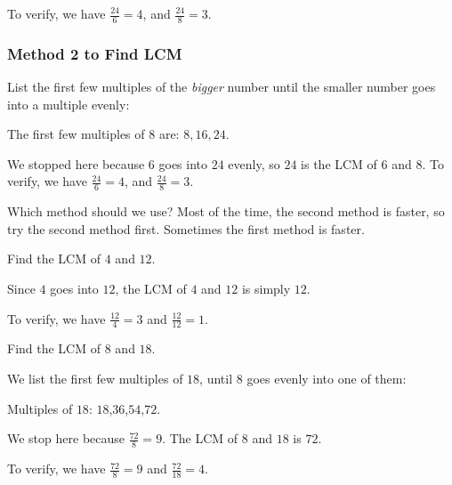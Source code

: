 To verify, we have $\frac{24}{6}=4$, and $\frac{24}{8}=3$.

\subsubsection{Method 2 to Find LCM}
List the first few multiples of the \textit{bigger} number until the smaller number goes into a multiple evenly:

The first few multiples of $8$ are: $8,16,24$.

We stopped here because $6$ goes into $24$ evenly, so $24$ is the LCM of $6$ and $8$. To verify, we have $\frac{24}{6}=4$, and $\frac{24}{8}=3$.

Which method should we use? Most of the time, the second method is faster, so try the second method first. Sometimes the first method is faster.

\begin{myexample}
Find the LCM of $4$ and $12$.
\end{myexample}
\begin{solution}
Since $4$ goes into $12$, the LCM of $4$ and $12$ is simply $12$.

To verify, we have $\frac{12}{4}=3$ and $\frac{12}{12}=1$.
\end{solution}

\begin{myexample}
Find the LCM of $8$ and $18$.
\end{myexample}
\begin{solution}
We list the first few multiples of $18$, until $8$ goes evenly into one of them:

Multiples of $18$: $18$,$36$,$54$,$72$.

We stop here because $\frac{72}{8}=9$. The LCM of $8$ and $18$ is $72$.

To verify, we have $\frac{72}{8}=9$ and $\frac{72}{18}=4$.
\end{solution}

